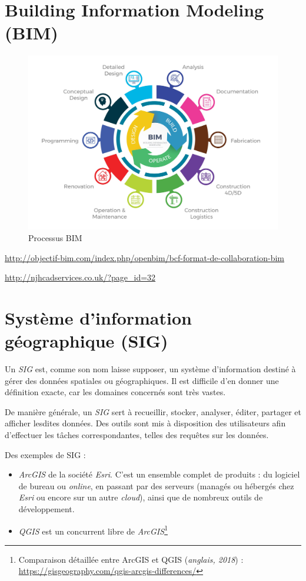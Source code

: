 \section{Building Information Modeling (BIM)}

\begin{figure}
    \centering
    \includegraphics[width=\linewidth]{Figures/bim-process.jpg}
    \caption{Processus BIM}
    \label{fig:bim-process}
\end{figure}

\url{http://objectif-bim.com/index.php/openbim/bcf-format-de-collaboration-bim}

\url{http://njhcadservices.co.uk/?page_id=32}

\section{Système d'information géographique (SIG)}
Un \textit{SIG} est, comme son nom laisse supposer, un système d'information destiné à gérer des données spatiales ou géographiques. Il est difficile d'en donner une définition exacte, car les domaines concernés sont très vastes.

De manière générale, un \textit{SIG} sert à recueillir, stocker, analyser, éditer, partager et afficher lesdites données. Des outils sont mis à disposition des utilisateurs afin d'effectuer les tâches correspondantes, telles des requêtes sur les données.

Des exemples de SIG :

\begin{itemize}
    \item \textit{ArcGIS} de la société \textit{Esri}. C'est un ensemble complet de produits : du logiciel de bureau ou \textit{online}, en passant par des serveurs (managés ou hébergés chez \textit{Esri} ou encore sur un autre \textit{cloud}), ainsi que de nombreux outils de développement.
    \item \textit{QGIS} est un concurrent libre de \textit{ArcGIS}\footnote{Comparaison détaillée entre ArcGIS et QGIS (\textit{anglais, 2018}) : \url{https://gisgeography.com/qgis-arcgis-differences/}}
\end{itemize}

